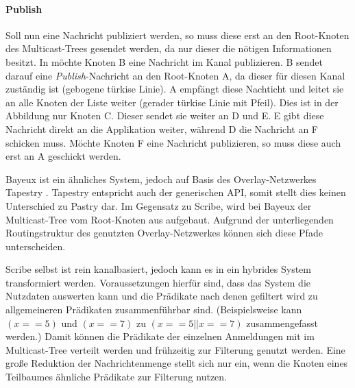 \paragraph{Publish}
Soll nun eine Nachricht publiziert werden, so muss diese erst an den Root-Knoten des Multicast-Trees gesendet werden, da nur dieser die nötigen Informationen besitzt. In  möchte Knoten B eine Nachricht im Kanal publizieren. B sendet darauf eine \emph{Publish}-Nachricht an den Root-Knoten A, da dieser für diesen Kanal zuständig ist (gebogene türkise Linie). A empfängt diese Nachticht und leitet sie an alle Knoten der Liste weiter (gerader türkise Linie mit Pfeil). Dies ist in der Abbildung nur Knoten C. Dieser sendet sie weiter an D und E. E gibt diese Nachricht direkt an die Applikation weiter, während D die Nachricht an F schicken muss. Möchte Knoten F eine Nachricht publizieren, so muss diese auch erst an A geschickt werden.

Bayeux \cite{Zhuang2001} ist ein ähnliches System, jedoch auf Basis des Overlay-Netzwerkes Tapestry \cite{Zhao2004Tapestry}. Tapestry entspricht auch der generischen API, somit stellt dies keinen Unterschied zu Pastry dar. Im Gegensatz zu Scribe, wird bei Bayeux der Multicast-Tree vom Root-Knoten aus aufgebaut. Aufgrund der unterliegenden Routingstruktur des genutzten Overlay-Netzwerkes können sich diese Pfade unterscheiden.

Scribe selbst ist rein kanalbasiert, jedoch kann es in ein hybrides System transformiert werden. Voraussetzungen hierfür sind, dass das System die Nutzdaten auswerten kann und die Prädikate nach denen gefiltert wird zu allgemeineren Prädikaten zusammenführbar sind. (Beispielsweise kann $(x == 5)$ und $(x == 7)$ zu $(x == 5 || x == 7)$ zusammengefasst werden.) Damit können die Prädikate der einzelnen Anmeldungen mit im Multicast-Tree verteilt werden und frühzeitig zur Filterung genutzt werden. Eine große Reduktion der Nachrichtenmenge stellt sich nur ein, wenn die Knoten eines Teilbaumes ähnliche Prädikate zur Filterung nutzen.
